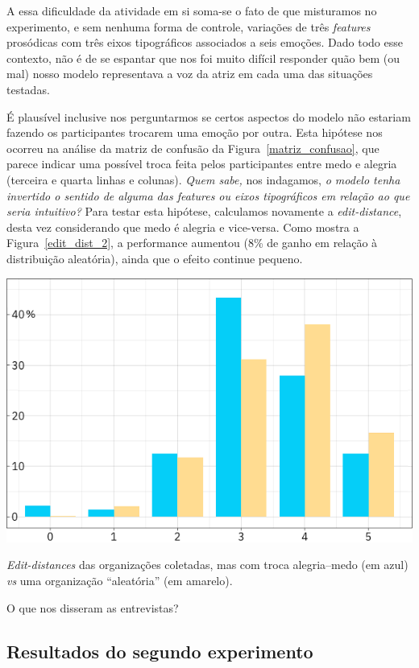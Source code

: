 \documentclass{tufte-handout}
\begin{document}
A essa dificuldade da atividade em si soma-se o fato de que misturamos no experimento, e sem nenhuma forma de controle, variações de três \textit{features} prosódicas com três eixos tipográficos associados a seis emoções. Dado todo esse contexto, não é de se espantar que nos foi muito difícil responder quão bem (ou mal) nosso modelo representava a voz da atriz em cada uma das situações testadas. 

É plausível inclusive nos perguntarmos se certos aspectos do modelo não estariam fazendo os participantes trocarem uma emoção por outra. Esta hipótese nos ocorreu na análise da matriz de confusão da Figura~\ref{matriz_confusao}, que parece indicar uma possível troca feita pelos participantes entre medo e alegria (terceira e quarta linhas e colunas). \textit{Quem sabe,} nos indagamos, \textit{o modelo tenha invertido o sentido de alguma das features ou eixos tipográficos em relação ao que seria intuitivo?} Para testar esta hipótese, calculamos novamente a \textit{edit-distance}, desta vez considerando que medo é alegria e vice-versa. Como mostra a Figura~\ref{edit_dist_2}, a performance aumentou (8\% de ganho em relação à distribuição aleatória), ainda que o efeito continue pequeno.

\begin{marginfigure}[0.5\baselineskip]
  \includegraphics{imgs/edit_distance_troca.png}
  \caption{\textit{Edit-distances} das organizações coletadas, mas com troca alegria--medo (em azul) \textit{vs} uma organização ``aleatória'' (em amarelo).}
  \label{edit_dist_2}
\end{marginfigure}

O que nos disseram as entrevistas? 

\subsection{Resultados do segundo experimento}

\renewcommand{\refname}{Bibliografia}
\makeatletter
\renewcommand{\bibsection}{%
   \section{\refname%
            \@mkboth{\MakeUppercase{\refname}}{\MakeUppercase{\refname}}%
   }
}
\makeatother




\end{document}
